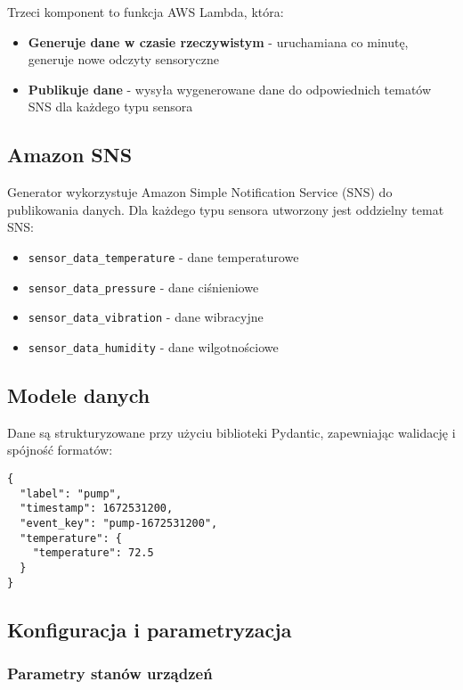 Trzeci komponent to funkcja AWS Lambda, która:

\begin{itemize}
    \item \textbf{Generuje dane w czasie rzeczywistym} - uruchamiana co minutę, generuje nowe odczyty sensoryczne
    \item \textbf{Publikuje dane} - wysyła wygenerowane dane do odpowiednich tematów SNS dla każdego typu sensora
\end{itemize}

\subsection{Amazon SNS}
\label{subsec:amazon_sns}

Generator wykorzystuje Amazon Simple Notification Service (SNS) do publikowania danych. Dla każdego typu sensora utworzony jest oddzielny temat SNS:

\begin{itemize}
    \item \texttt{sensor\_data\_temperature} - dane temperaturowe
    \item \texttt{sensor\_data\_pressure} - dane ciśnieniowe  
    \item \texttt{sensor\_data\_vibration} - dane wibracyjne
    \item \texttt{sensor\_data\_humidity} - dane wilgotnościowe
\end{itemize}

\subsection{Modele danych}
\label{subsec:modele_danych}

Dane są strukturyzowane przy użyciu biblioteki Pydantic, zapewniając walidację i spójność formatów:

\begin{verbatim}
{
  "label": "pump",
  "timestamp": 1672531200,
  "event_key": "pump-1672531200",
  "temperature": {
    "temperature": 72.5
  }
}
\end{verbatim}

\subsection{Konfiguracja i parametryzacja}
\label{sec:konfiguracja}

\subsubsection{Parametry stanów urządzeń}
\label{subsec:parametry_stanow}

